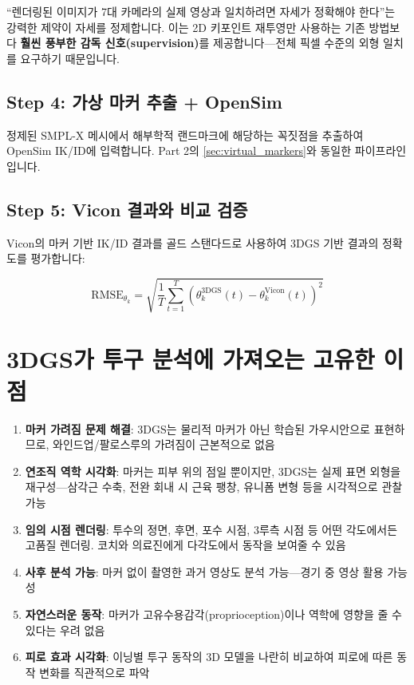 \documentclass[11pt, a4paper]{report}
\begin{document}
``렌더링된 이미지가 7대 카메라의 실제 영상과 일치하려면 자세가 정확해야 한다''는 강력한 제약이 자세를 정제합니다. 이는 2D 키포인트 재투영만 사용하는 기존 방법보다 \textbf{훨씬 풍부한 감독 신호(supervision)}를 제공합니다---전체 픽셀 수준의 외형 일치를 요구하기 때문입니다.

\subsection{Step 4: 가상 마커 추출 + OpenSim}

정제된 SMPL-X 메시에서 해부학적 랜드마크에 해당하는 꼭짓점을 추출하여 OpenSim IK/ID에 입력합니다. Part 2의 \cref{sec:virtual_markers}와 동일한 파이프라인입니다.

\subsection{Step 5: Vicon 결과와 비교 검증}

Vicon의 마커 기반 IK/ID 결과를 골드 스탠다드로 사용하여 3DGS 기반 결과의 정확도를 평가합니다:

\begin{equation}
\text{RMSE}_{\theta_k} = \sqrt{\frac{1}{T}\sum_{t=1}^{T} (\theta_k^{\text{3DGS}}(t) - \theta_k^{\text{Vicon}}(t))^2}
\end{equation}


\section{3DGS가 투구 분석에 가져오는 고유한 이점}
\label{sec:3dgs_advantages}

\begin{enumerate}[leftmargin=*]
  \item \textbf{마커 가려짐 문제 해결}: 3DGS는 물리적 마커가 아닌 학습된 가우시안으로 표현하므로, 와인드업/팔로스루의 가려짐이 근본적으로 없음

  \item \textbf{연조직 역학 시각화}: 마커는 피부 위의 점일 뿐이지만, 3DGS는 실제 표면 외형을 재구성---삼각근 수축, 전완 회내 시 근육 팽창, 유니폼 변형 등을 시각적으로 관찰 가능

  \item \textbf{임의 시점 렌더링}: 투수의 정면, 후면, 포수 시점, 3루측 시점 등 어떤 각도에서든 고품질 렌더링. 코치와 의료진에게 다각도에서 동작을 보여줄 수 있음

  \item \textbf{사후 분석 가능}: 마커 없이 촬영한 과거 영상도 분석 가능---경기 중 영상 활용 가능성

  \item \textbf{자연스러운 동작}: 마커가 고유수용감각(proprioception)이나 역학에 영향을 줄 수 있다는 우려 없음

  \item \textbf{피로 효과 시각화}: 이닝별 투구 동작의 3D 모델을 나란히 비교하여 피로에 따른 동작 변화를 직관적으로 파악
\end{enumerate}
\end{document}
